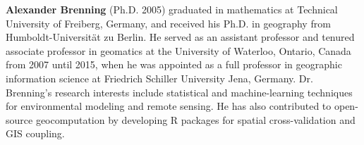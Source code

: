 \documentclass[remotesensing,article,submit,moreauthors,pdftex]{Definitions/mdpi}
\begin{document}
\bio
{}
{\textbf{Alexander Brenning} (Ph.D. 2005) graduated in mathematics at Technical University of Freiberg, Germany, and received his Ph.D. in geography from Humboldt-Universität zu Berlin.
	He served as an assistant professor and tenured associate professor in geomatics at the University of Waterloo, Ontario, Canada from 2007 until 2015, when he was appointed as a full professor in geographic information science at Friedrich Schiller University Jena, Germany.
	Dr. Brenning's research interests include statistical and machine-learning techniques for environmental modeling and remote sensing.
	He has also contributed to open-source geocomputation by developing R packages for spatial cross-validation and GIS coupling.}

\end{document}

